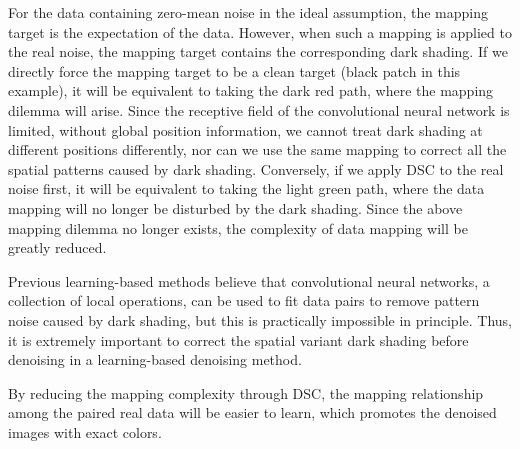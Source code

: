 \documentclass[sigconf,screen,nonacm]{acmart}
\begin{document}
For the data containing zero-mean noise in the ideal assumption, the mapping target is the expectation of the data. However, when such a mapping is applied to the real noise, the mapping target contains the corresponding dark shading.
    If we directly force the mapping target to be a clean target (black patch in this example), it will be equivalent to taking the dark red path, where the mapping dilemma will arise. Since the receptive field of the convolutional neural network is limited, without global position information, we cannot treat dark shading at different positions differently, nor can we use the same mapping to correct all the spatial patterns caused by dark shading.
    Conversely, if we apply DSC to the real noise first, it will be equivalent to taking the light green path, where the data mapping will no longer be disturbed by the dark shading. Since the above mapping dilemma no longer exists, the complexity of data mapping will be greatly reduced.

    Previous learning-based methods believe that convolutional neural networks, a collection of local operations, can be used to fit data pairs to remove pattern noise caused by dark shading, but this is practically impossible in principle.
    Thus, it is extremely important to correct the spatial variant dark shading before denoising in a learning-based denoising method.
    
    By reducing the mapping complexity through DSC, the mapping relationship among the paired real data will be easier to learn, which promotes the denoised images with exact colors.
\end{document}
